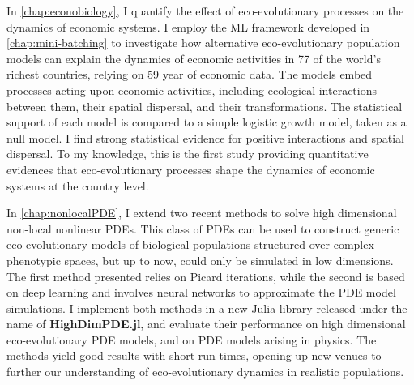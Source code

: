 In \cref{chap:econobiology}, I quantify the effect of eco-evolutionary processes on the dynamics of economic systems. I employ the ML framework developed in \cref{chap:mini-batching} to investigate how alternative eco-evolutionary population models can explain the dynamics of economic activities in 77 of the world's richest countries, relying on 59 year of economic data. The models embed processes acting upon economic activities, including ecological interactions between them, their spatial dispersal, and their transformations. The statistical support of each model is compared to a simple logistic growth model, taken as a null model. I find strong statistical evidence for positive interactions and spatial dispersal. To my knowledge, this is the first study providing quantitative evidences that eco-evolutionary processes shape the dynamics of economic systems at the country level.

In \cref{chap:nonlocalPDE}, I extend two recent methods to solve high dimensional non-local nonlinear PDEs. This class of PDEs can be used to construct generic eco-evolutionary models of biological populations structured over complex phenotypic spaces, but up to now, could only be simulated in low dimensions. The first method presented relies on Picard iterations, while the second is based on deep learning and involves neural networks to approximate the PDE model simulations. I implement both methods in a new Julia library released under the name of \textbf{HighDimPDE.jl}, and evaluate their performance on high dimensional eco-evolutionary PDE models, and on PDE models arising in physics. The methods yield good results with short run times, opening up new venues to further our understanding of eco-evolutionary dynamics in realistic populations.

\newpage
